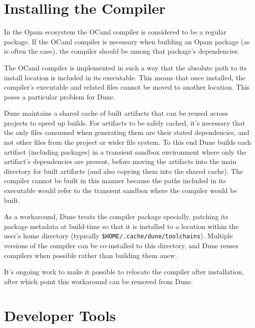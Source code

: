 \documentclass{article}
\begin{document}
\begin{multicols}{2}
        \section {Installing the Compiler}

        In the Opam ecosystem the OCaml compiler is considered to be a regular
        package. If the OCaml compiler is necessary when building an Opam
        package (as is often the case), the compiler should be
        among that package's dependencies.

        The OCaml compiler is implemented in such a way that the absolute path
        to its install location is included in its executable. This means that
        once installed, the compiler's executable and related files cannot be
        moved to another location. This poses a particular problem for Dune.

        Dune maintains a shared cache of built artifacts that can be reused
        across projects to speed up builds. For artifacts to be safely cached,
        it's necessary that the only files consumed when generating them are
        their stated dependencies, and not other files from the project or wider
        file system. To this end Dune builds each artifact (including packages)
        in a transient sandbox environment where only the artifact's
        dependencies are present, before moving the artifacts into the main
        directory for built artifacts (and also copying them into the shared
        cache). The compiler cannot be built in this manner because the paths
        included in its executable would refer to the transient sandbox where
        the compiler would be built.

        As a workaround, Dune treats the compiler package specially, patching
        its package metadata at build-time so that it is installed to a location
        within the user's home directory (typically
        \texttt{\$HOME/.cache/dune/toolchains}). Multiple versions of the
        compiler can be co-installed to this directory, and Dune reuses
        compilers when possible rather than building them anew.

        It's ongoing work to make it possible to relocate the compiler after
        installation, after which point this workaround can be removed from
        Dune.

        \section {Developer Tools}


\end{multicols}
\end{document}

